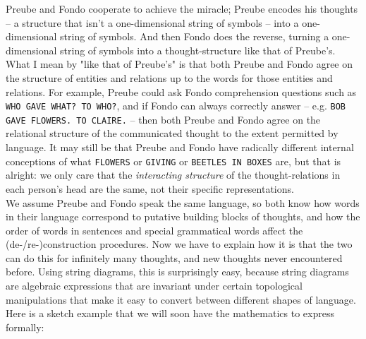 \begin{fullwidth}
Preube and Fondo cooperate to achieve the miracle; Preube encodes his thoughts -- a structure that isn't a one-dimensional string of symbols -- into a one-dimensional string of symbols. And then Fondo does the reverse, turning a one-dimensional string of symbols into a thought-structure like that of Preube's. What I mean by "like that of Preube's" is that both Preube and Fondo agree on the structure of entities and relations up to the words for those entities and relations. For example, Preube could ask Fondo comprehension questions such as \texttt{WHO GAVE WHAT? TO WHO?}, and if Fondo can always correctly answer -- e.g. \texttt{BOB GAVE FLOWERS. TO CLAIRE.} -- then both Preube and Fondo agree on the relational structure of the communicated thought to the extent permitted by language. It may still be that Preube and Fondo have radically different internal conceptions of what \texttt{FLOWERS} or \texttt{GIVING} or \texttt{BEETLES IN BOXES} are, but that is alright: we only care that the \emph{interacting structure} of the thought-relations in each person's head are the same, not their specific representations.\\

We assume Preube and Fondo speak the same language, so both know how words in their language correspond to putative building blocks of thoughts, and how the order of words in sentences and special grammatical words affect the (de-/re-)construction procedures. Now we have to explain how it is that the two can do this for infinitely many thoughts, and new thoughts never encountered before. Using string diagrams, this is surprisingly easy, because string diagrams are algebraic expressions that are invariant under certain topological manipulations that make it easy to convert between different shapes of language. Here is a sketch example that we will soon have the mathematics to express formally:\\


\end{fullwidth}
